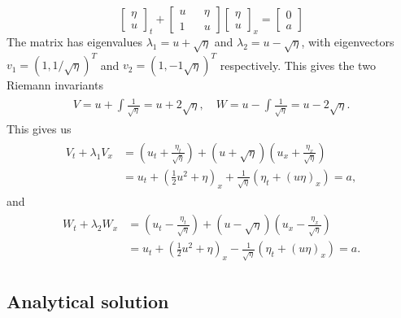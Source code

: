 \documentclass[11pt]{article}
\begin{document}
\begin{equation*}
\begin{bmatrix}
	\eta \\
	u
\end{bmatrix}_t
+
\begin{bmatrix}
u	&& 	\eta \\
1 	&&	u
\end{bmatrix}
\begin{bmatrix}
\eta\\
u
\end{bmatrix}_x
= 
\begin{bmatrix}
0\\
a
\end{bmatrix}
\end{equation*}
The matrix has eigenvalues $\lambda_1 = u + \sqrt{\eta}$ and $\lambda_2 = u - \sqrt{\eta}$, with eigenvectors $v_1 = (1,1/\sqrt{\eta})^T$ and $v_2 = (1, {-}1\sqrt{\eta})^T$ respectively. This gives the two Riemann invariants
\begin{align*}
	\begin{aligned}
		V = u + \int \frac{1}{\sqrt{\eta}} = u + 2\sqrt{\eta},\quad
		W = u - \int \frac{1}{\sqrt{\eta}} = u - 2\sqrt{\eta}.
	\end{aligned}
\end{align*}
This gives us
\begin{align}
\begin{aligned}
	\label{eq:shallowWaterRiemannV}
	V_t + \lambda_1V_x &= \left(u_t + \frac{\eta_t}{\sqrt{\eta}}\right) + (u + \sqrt{\eta})\left(u_x + \frac{\eta_x}{\sqrt \eta}\right)\\
	& = u_t + \left(\frac{1}{2}u^2 + \eta\right)_x + \frac{1}{\sqrt \eta}(\eta_t + (u\eta)_x) = a,
\end{aligned}
\end{align}
and
\begin{align}
	\label{eq:shallowWaterRiemannW}
	\begin{aligned}
		W_t + \lambda_2W_x &= \left(u_t - \frac{\eta_t}{\sqrt{\eta}}\right) + (u - \sqrt{\eta})\left(u_x - \frac{\eta_x}{\sqrt \eta}\right)\\
		& = u_t + \left(\frac{1}{2}u^2 + \eta\right)_x - \frac{1}{\sqrt \eta}(\eta_t + (u\eta)_x) = a.
	\end{aligned}
\end{align}
\subsection{Analytical solution}
\end{document}
